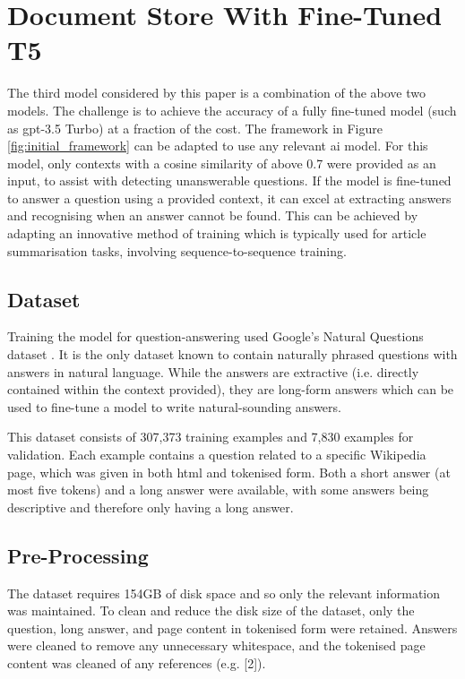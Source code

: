 \section{Document Store With Fine-Tuned T5}\label{sec:methodology_t5}
The third model considered by this paper is a combination of the above two models. The challenge is to achieve the accuracy of a fully fine-tuned model (such as \acrshort{gpt}-3.5 Turbo) at a fraction of the cost. The framework in Figure \ref{fig:initial_framework} can be adapted to use any relevant \acrshort{ai} model. For this model, only contexts with a cosine similarity of above 0.7 were provided as an input, to assist with detecting unanswerable questions. If the model is fine-tuned to answer a question using a provided context, it can excel at extracting answers and recognising when an answer cannot be found. This can be achieved by adapting an innovative method of training which is typically used for article summarisation tasks, involving sequence-to-sequence training. 

\subsection{Dataset}
Training the model for question-answering used Google's Natural Questions dataset \citep{NQdataset}. It is the only dataset known to contain naturally phrased questions with answers in natural language. While the answers are extractive (i.e. directly contained within the context provided), they are long-form answers which can be used to fine-tune a model to write natural-sounding answers.

This dataset consists of 307,373 training examples and 7,830 examples for validation. Each example contains a question related to a specific Wikipedia page, which was given in both \acrshort{html} and tokenised form. Both a short answer (at most five tokens) and a long answer were available, with some answers being descriptive and therefore only having a long answer.

\subsection{Pre-Processing}\label{sec:methodology_pre_processing}
The dataset requires 154GB of disk space and so only the relevant information was maintained. To clean and reduce the disk size of the dataset, only the question, long answer, and page content in tokenised form were retained. Answers were cleaned to remove any unnecessary whitespace, and the tokenised page content was cleaned of any references (e.g. [2]).

